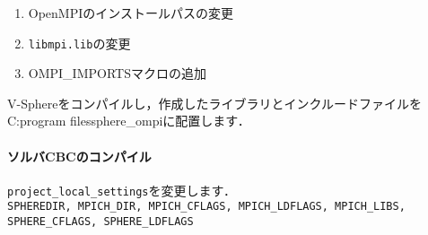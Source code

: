 \begin{enumerate}
\item OpenMPIのインストールパスの変更
\item \verb|libmpi.lib|の変更
\item OMPI\_IMPORTSマクロの追加
\end{enumerate}

V-Sphereをコンパイルし，作成したライブラリとインクルードファイルをC:{\yen}program files{\yen}sphere\_ompiに配置します．

{\small
{}
}

%
\paragraph{ソルバCBCのコンパイル}
\verb|project_local_settings|を変更します．\\
\verb|SPHEREDIR, MPICH_DIR, MPICH_CFLAGS, MPICH_LDFLAGS, MPICH_LIBS, SPHERE_CFLAGS, SPHERE_LDFLAGS|


